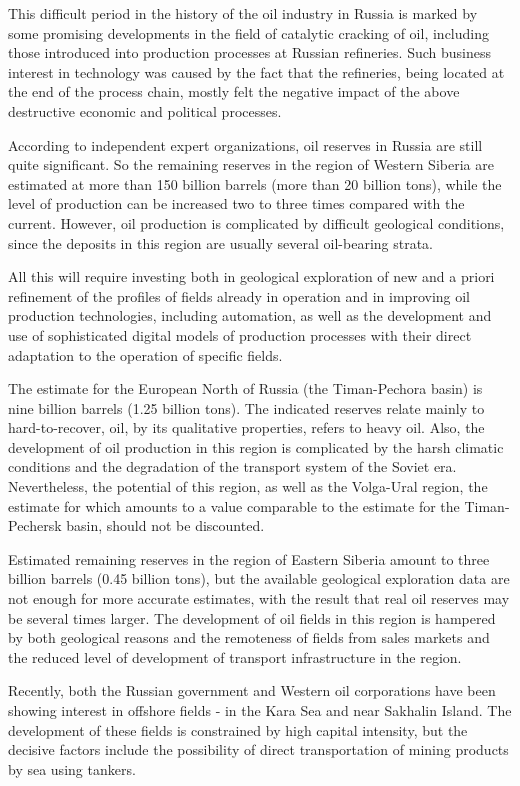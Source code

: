 \documentclass[12pt]{report}
\theoremstyle{definition}
\begin{document}
This difficult period in the history of the oil industry in Russia is marked by some promising developments in the field of catalytic cracking of oil, including those introduced into production processes at Russian refineries.
Such business interest in technology was caused by the fact that the refineries, being located at the end of the process chain, mostly felt the negative impact of the above destructive economic and political processes.

According to independent expert organizations, oil reserves in Russia are still quite significant.
So the remaining reserves in the region of Western Siberia are estimated at more than 150 billion barrels (more than 20 billion tons), while the level of production can be increased two to three times compared with the current.
However, oil production is complicated by difficult geological conditions, since the deposits in this region are usually several oil-bearing strata.

All this will require investing both in geological exploration of new and a priori refinement of the profiles of fields already in operation and in improving oil production technologies, including automation, as well as the development and use of sophisticated digital models of production processes with their direct adaptation to the operation of specific fields.

The estimate for the European North of Russia (the Timan-Pechora basin) is nine billion barrels (1.25 billion tons).
The indicated reserves relate mainly to hard-to-recover, oil, by its qualitative properties, refers to heavy oil.
Also, the development of oil production in this region is complicated by the harsh climatic conditions and the degradation of the transport system of the Soviet era.
Nevertheless, the potential of this region, as well as the Volga-Ural region, the estimate for which amounts to a value comparable to the estimate for the Timan-Pechersk basin, should not be discounted.

Estimated remaining reserves in the region of Eastern Siberia amount to three billion barrels (0.45 billion tons), but the available geological exploration data are not enough for more accurate estimates, with the result that real oil reserves may be several times larger.
The development of oil fields in this region is hampered by both geological reasons and the remoteness of fields from sales markets and the reduced level of development of transport infrastructure in the region.

Recently, both the Russian government and Western oil corporations have been showing interest in offshore fields - in the Kara Sea and near Sakhalin Island.
The development of these fields is constrained by high capital intensity, but the decisive factors include the possibility of direct transportation of mining products by sea using tankers.
\end{document}
